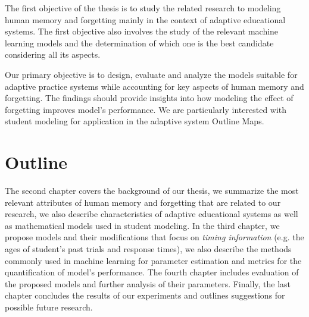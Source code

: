 The first objective of the thesis is to study the related research to modeling human memory and forgetting mainly in the context of adaptive educational systems. The first objective also involves the study of the relevant machine learning models and the determination of which one is the best candidate considering all its aspects.

Our primary objective is to design, evaluate and analyze the models suitable for adaptive practice systems while accounting for key aspects of human memory and forgetting. The findings should provide insights into how modeling the effect of forgetting improves model's performance. We are particularly interested with student modeling for application in the adaptive system Outline Maps.

\section{Outline}

The second chapter covers the background of our thesis, we summarize the most relevant attributes of human memory and forgetting that are related to our research, we also describe characteristics of adaptive educational systems as well as mathematical models used in student modeling. In the third chapter, we propose models and their modifications that focus on \textit{timing information} (e.g. the ages of student's past trials and response times), we also describe the methods commonly used in machine learning for parameter estimation and metrics for the quantification of model's performance. The fourth chapter includes evaluation of the proposed models and further analysis of their parameters. Finally, the last chapter concludes the results of our experiments and outlines suggestions for possible future research.

